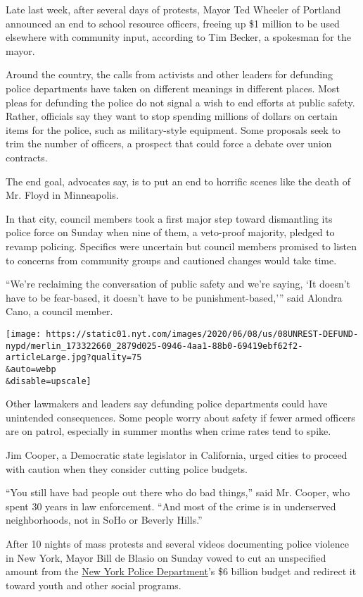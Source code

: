 Late last week, after several days of protests, Mayor Ted Wheeler of
Portland announced an end to school resource officers, freeing up \$1
million to be used elsewhere with community input, according to Tim
Becker, a spokesman for the mayor.

Around the country, the calls from activists and other leaders for
defunding police departments have taken on different meanings in
different places. Most pleas for defunding the police do not signal a
wish to end efforts at public safety. Rather, officials say they want to
stop spending millions of dollars on certain items for the police, such
as military-style equipment. Some proposals seek to trim the number of
officers, a prospect that could force a debate over union contracts.

The end goal, advocates say, is to put an end to horrific scenes like
the death of Mr. Floyd in Minneapolis.

In that city, council members took a first major step toward dismantling
its police force on Sunday when nine of them, a veto-proof majority,
pledged to revamp policing. Specifics were uncertain but council members
promised to listen to concerns from community groups and cautioned
changes would take time.

``We're reclaiming the conversation of public safety and we're saying,
`It doesn't have to be fear-based, it doesn't have to be
punishment-based,''' said Alondra Cano, a council member.

\texttt{[image: https://static01.nyt.com/images/2020/06/08/us/08UNREST-DEFUND-nypd/merlin\_173322660\_2879d025-0946-4aa1-88b0-69419ebf62f2-articleLarge.jpg?quality=75\\\&auto=webp\\\&disable=upscale]}

Other lawmakers and leaders say defunding police departments could have
unintended consequences. Some people worry about safety if fewer armed
officers are on patrol, especially in summer months when crime rates
tend to spike.

Jim Cooper, a Democratic state legislator in California, urged cities to
proceed with caution when they consider cutting police budgets.

``You still have bad people out there who do bad things,'' said Mr.
Cooper, who spent 30 years in law enforcement. ``And most of the crime
is in underserved neighborhoods, not in SoHo or Beverly Hills.''

After 10 nights of mass protests and several videos documenting police
violence in New York, Mayor Bill de Blasio on Sunday vowed to cut an
unspecified amount from the
\href{https://www.nytimes.com/2020/06/15/nyregion/nypd-plainclothes-cops.html}{New
York Police Department}'s \$6 billion budget and redirect it toward
youth and other social programs.

